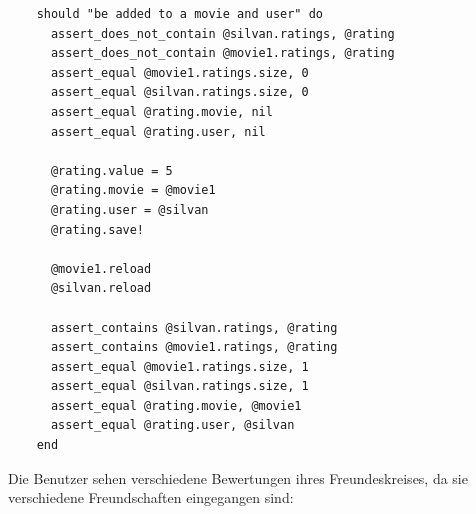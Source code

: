 \begin{verbatim}
    should "be added to a movie and user" do
      assert_does_not_contain @silvan.ratings, @rating
      assert_does_not_contain @movie1.ratings, @rating
      assert_equal @movie1.ratings.size, 0
      assert_equal @silvan.ratings.size, 0
      assert_equal @rating.movie, nil
      assert_equal @rating.user, nil
      
      @rating.value = 5
      @rating.movie = @movie1
      @rating.user = @silvan
      @rating.save!
      
      @movie1.reload
      @silvan.reload
      
      assert_contains @silvan.ratings, @rating
      assert_contains @movie1.ratings, @rating
      assert_equal @movie1.ratings.size, 1
      assert_equal @silvan.ratings.size, 1
      assert_equal @rating.movie, @movie1
      assert_equal @rating.user, @silvan
    end
\end{verbatim}

Die Benutzer sehen verschiedene Bewertungen ihres Freundeskreises, da sie
verschiedene Freundschaften eingegangen sind:

